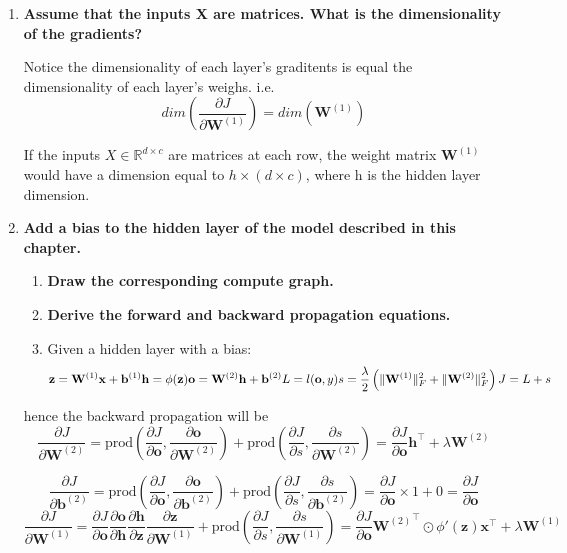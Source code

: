 \documentclass[11pt]{article}
\begin{document}
\begin{enumerate}
\def\labelenumi{\arabic{enumi}.}
\item
  \textbf{Assume that the inputs X are matrices. What is the
  dimensionality of the gradients?}

  Notice the dimensionality of each layer's graditents is equal the
  dimensionality of each layer's weighs. i.e.
  \[ dim(\frac{\partial J}{\partial \mathbf{W}^{(1)}}) = dim(\mathbf{W}^{(1)})\]

  If the inputs \(X \in \mathbb{R}^{d \times c}\) are matrices at each
  row, the weight matrix \(\mathbf{W}^{(1)}\) would have a dimension
  equal to \({h \times (d \times c)}\), where h is the hidden layer
  dimension.
\item
  \textbf{Add a bias to the hidden layer of the model described in this
  chapter.}

  \begin{enumerate}
  \def\labelenumii{\alph{enumii}.}
  \item
    \textbf{Draw the corresponding compute graph.}
  \item
    \textbf{Derive the forward and backward propagation equations.}
  \item
    Given a hidden layer with a bias:
    \[\mathbf{z}= \mathbf{W}^{(1)} \mathbf{x} + \mathbf{b}^{(1)}\\
      \mathbf{h}= \phi (\mathbf{z}) \\
      \mathbf{o}= \mathbf{W}^{(2)} \mathbf{h} + \mathbf{b}^{(2)}\\
      L = l(\mathbf{o}, y) \\
      s = \frac{\lambda}{2} \left(\|\mathbf{W}^{(1)}\|_F^2 + \|\mathbf{W}^{(2)}\|_F^2\right) \\
      J = L + s\]
  \end{enumerate}

  hence the backward propagation will be
  \[ \frac{\partial J}{\partial \mathbf{W}^{(2)}}
      = \text{prod}\left(\frac{\partial J}{\partial \mathbf{o}}, \frac{\partial \mathbf{o}}{\partial \mathbf{W}^{(2)}}\right) + \text{prod}\left(\frac{\partial J}{\partial s}, \frac{\partial s}{\partial \mathbf{W}^{(2)}}\right)
      = \frac{\partial J}{\partial \mathbf{o}} \mathbf{h}^\top + \lambda \mathbf{W}^{(2)}\]

  \[ \frac{\partial J}{\partial \mathbf{b}^{(2)}}
      = \text{prod}\left(\frac{\partial J}{\partial \mathbf{o}}, \frac{\partial \mathbf{o}}{\partial \mathbf{b}^{(2)}}\right)  + \text{prod}\left(\frac{\partial J}{\partial s}, \frac{\partial s}{\partial \mathbf{b}^{(2)}}\right)
      = \frac{\partial J}{\partial \mathbf{o}} \times 1 + 0
      = \frac{\partial J}{\partial \mathbf{o}}\]
  \[ \frac{\partial J}{\partial \mathbf{W}^{(1)}}
      = \frac{\partial J}{\partial \mathbf{o}} \frac{\partial \mathbf{o}}{\partial \mathbf{h}} \frac{\partial \mathbf{h}}{\partial \mathbf{z}} \frac{\partial \mathbf{z}}{\partial \mathbf{W}^{(1)}} + \text{prod}\left(\frac{\partial J}{\partial s}, \frac{\partial s}{\partial \mathbf{W}^{(1)}}\right)
      = \frac{\partial J}{\partial \mathbf{o}} {\mathbf{W}^{(2)}}^\top \odot \phi'\left(\mathbf{z}\right) {\mathbf{x}}^\top + \lambda \mathbf{W}^{(1)}\]


\end{enumerate}
\end{document}
